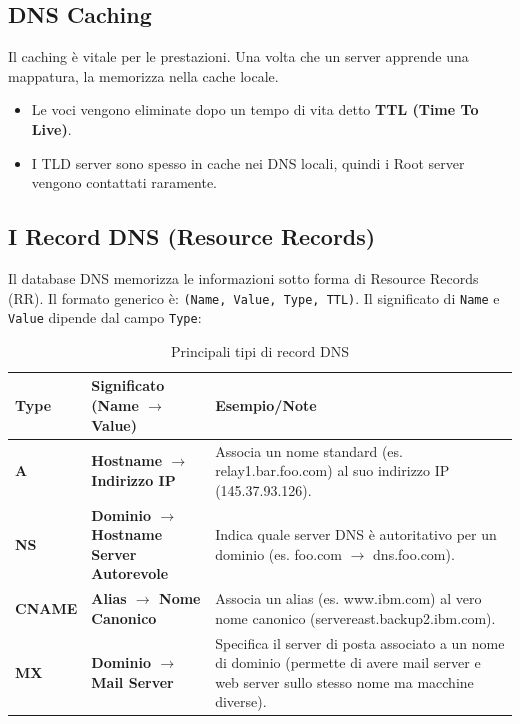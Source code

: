 \documentclass[a4paper,12pt]{report}
\begin{document}
\subsection*{DNS Caching}

Il caching è vitale per le prestazioni. Una volta che un server apprende una mappatura, la memorizza nella cache locale.
\begin{itemize}
    \item Le voci vengono eliminate dopo un tempo di vita detto \textbf{TTL (Time To Live)}.
    \item I TLD server sono spesso in cache nei DNS locali, quindi i Root server vengono contattati raramente.
\end{itemize}

\newpage
\subsection*{I Record DNS (Resource Records)}

Il database DNS memorizza le informazioni sotto forma di Resource Records (RR).
Il formato generico è: \texttt{(Name, Value, Type, TTL)}.
Il significato di \texttt{Name} e \texttt{Value} dipende dal campo \texttt{Type}:

\begin{table}[H]
\centering
\begin{tabularx}{\textwidth}{l X X}
\toprule
\textbf{Type} & \textbf{Significato (Name $\to$ Value)} & \textbf{Esempio/Note} \\
\midrule
\textbf{A} & \textbf{Hostname $\to$ Indirizzo IP} & Associa un nome standard (es. relay1.bar.foo.com) al suo indirizzo IP (145.37.93.126). \\
\midrule
\textbf{NS} & \textbf{Dominio $\to$ Hostname Server Autorevole} & Indica quale server DNS è autoritativo per un dominio (es. foo.com $\to$ dns.foo.com). \\
\midrule
\textbf{CNAME} & \textbf{Alias $\to$ Nome Canonico} & Associa un alias (es. www.ibm.com) al vero nome canonico (servereast.backup2.ibm.com). \\
\midrule
\textbf{MX} & \textbf{Dominio $\to$ Mail Server} & Specifica il server di posta associato a un nome di dominio (permette di avere mail server e web server sullo stesso nome ma macchine diverse). \\
\bottomrule
\end{tabularx}
\caption{Principali tipi di record DNS}
\end{table}
\end{document}
